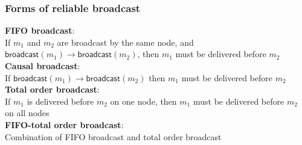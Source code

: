 \begin{frame}
    \label{s:broadcast-order}
    \frametitle{Forms of reliable broadcast}
    \textbf{FIFO broadcast}:\\
    If $m_1$ and $m_2$ are broadcast by the same node, and $\mathsf{broadcast}(m_1) \rightarrow \mathsf{broadcast}(m_2)$, then $m_1$ must be delivered before $m_2$\\[1em]\pause
    \textbf{Causal broadcast}:\\
    If $\mathsf{broadcast}(m_1) \rightarrow \mathsf{broadcast}(m_2)$ then $m_1$ must be delivered before $m_2$\\[1em]\pause
    \textbf{Total order broadcast}:\\
    If $m_1$ is delivered before $m_2$ on one node, then $m_1$ must be delivered before $m_2$ on all nodes\\[1em]\pause
    \textbf{FIFO-total order broadcast}:\\
    Combination of FIFO broadcast and total order broadcast
\end{frame}
\label{l:broadcast-order}


